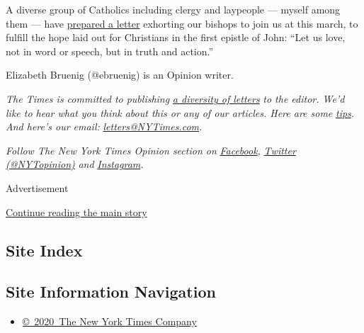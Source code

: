 A diverse group of Catholics including clergy and laypeople --- myself
among them --- have
\href{https://www.catholicsocialaction.com/open_letter_to_all_bishops}{prepared
a letter} exhorting our bishops to join us at this march, to fulfill the
hope laid out for Christians in the first epistle of John: ``Let us
love, not in word or speech, but in truth and action.''

Elizabeth Bruenig (@ebruenig) is an Opinion writer.

\emph{The Times is committed to publishing}
\href{https://www.nytimes3xbfgragh.onion/2019/01/31/opinion/letters/letters-to-editor-new-york-times-women.html}{\emph{a
diversity of letters}} \emph{to the editor. We'd like to hear what you
think about this or any of our articles. Here are some}
\href{https://help.nytimes3xbfgragh.onion/hc/en-us/articles/115014925288-How-to-submit-a-letter-to-the-editor}{\emph{tips}}\emph{.
And here's our email:}
\href{mailto:letters@NYTimes.com}{\emph{letters@NYTimes.com}}\emph{.}

\emph{Follow The New York Times Opinion section on}
\href{https://www.facebookcorewwwi.onion/nytopinion}{\emph{Facebook}}\emph{,}
\href{http://twitter.com/NYTOpinion}{\emph{Twitter (@NYTopinion)}}
\emph{and}
\href{https://www.instagram.com/nytopinion/}{\emph{Instagram}}\emph{.}

Advertisement

\protect\hyperlink{after-bottom}{Continue reading the main story}

\hypertarget{site-index}{%
\subsection{Site Index}\label{site-index}}

\hypertarget{site-information-navigation}{%
\subsection{Site Information
Navigation}\label{site-information-navigation}}

\begin{itemize}
\tightlist
\item
  \href{https://help.nytimes3xbfgragh.onion/hc/en-us/articles/115014792127-Copyright-notice}{©~2020~The
  New York Times Company}
\end{itemize}

